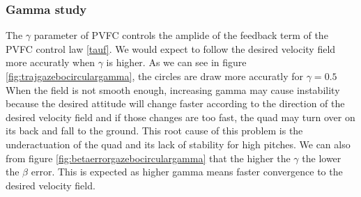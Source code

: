 \subsubsection{Gamma study}
The $\gamma$ parameter of PVFC controls the amplide of the feedback term of the PVFC control law \ref{tauf}.
We would expect to follow the desired velocity field more accuratly when $\gamma$ is higher.
As we can see in figure \ref{fig:trajgazebocirculargamma}, the circles are draw more accuratly for $\gamma=0.5$
When the field is not smooth enough, increasing gamma may cause instability because the desired attitude will change faster according to the direction of the desired
velocity field and if those changes are too fast, the quad may turn over on its back and fall to the ground. This root cause of this problem is the underactuation of the quad and its lack of stability for high pitches.
We can also from figure \ref{fig:betaerrorgazebocirculargamma} that the higher the $\gamma$ the lower the $\beta$ error. This is expected as higher gamma means faster convergence to the desired velocity field.

